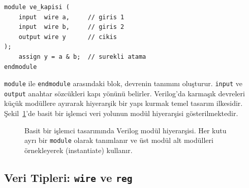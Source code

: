 \begin{lstlisting}[style=verilog, caption={Verilog modül yapısı: 2 girişli VE kapısı}, label={lst:ekd-ve-kapisi}]
module ve_kapisi (
    input  wire a,     // giris 1
    input  wire b,     // giris 2
    output wire y      // cikis
);
    assign y = a & b;  // surekli atama
endmodule
\end{lstlisting}

\texttt{module} ile \texttt{endmodule} arasındaki blok, devrenin tanımını oluşturur. \texttt{input} ve \texttt{output} anahtar sözcükleri kapı yönünü belirler. Verilog'da karmaşık devreleri küçük modüllere ayırarak hiyerarşik bir yapı kurmak temel tasarım ilkesidir. Şekil~\ref{fig:ekd-modul-hiyerarsi}'de basit bir işlemci veri yolunun modül hiyerarşisi gösterilmektedir.

\begin{figure}[H]
\centering
{}
\caption[Verilog modül hiyerarşisi]{Basit bir işlemci tasarımında Verilog modül hiyerarşisi. Her kutu ayrı bir \texttt{module} olarak tanımlanır ve üst modül alt modülleri örnekleyerek (instantiate) kullanır.}
\label{fig:ekd-modul-hiyerarsi}
\end{figure}

\subsection{Veri Tipleri: \texttt{wire} ve \texttt{reg}}
\label{sec:ekd-wire-reg}

